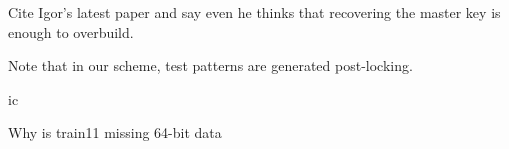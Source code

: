 Cite Igor's latest paper and say even he thinks that recovering the master key is enough to overbuild.

Note that in our scheme, test patterns are generated post-locking.

ic 



Why is train11 missing 64-bit data
